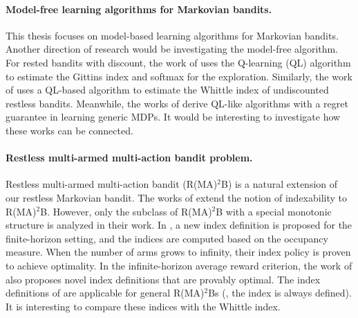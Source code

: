 \paragraph{Model-free learning algorithms for Markovian bandits.}
This thesis focuses on model-based learning algorithms for Markovian bandits. 
Another direction of research would be investigating the model-free algorithm.
For rested bandits with discount, the work of \cite{duff1995q} uses the Q-learning (QL) algorithm to estimate the Gittins index and softmax for the exploration.
Similarly, the work of \cite{avrachenkov2022whittle} uses a QL-based algorithm to estimate the Whittle index of undiscounted restless bandits.
Meanwhile, the works of \cite{jin2018q, wei2020model} derive QL-like algorithms with a regret guarantee in learning generic MDPs.
It would be interesting to investigate how these works can be connected.

\paragraph{Restless multi-armed multi-action bandit problem.}
Restless multi-armed multi-action bandit (R(MA)$^2$B) is a natural extension of our restless Markovian bandit.
The works of \cite{glazebrook2011general,hodge2015asymptotic} extend the notion of indexability to R(MA)$^2$B.
However, only the subclass of R(MA)$^2$B with a special monotonic structure is analyzed in their work.
In \cite{xiong2021reinforcement}, a new index definition is proposed for the finite-horizon setting, and the indices are computed based on the occupancy measure.
When the number of arms grows to infinity, their index policy is proven to achieve optimality.
In the infinite-horizon average reward criterion, the work of \cite{xiong2022learning} also proposes novel index definitions that are provably optimal.
The index definitions of \cite{xiong2021reinforcement, xiong2022learning} are applicable for general R(MA)$^2$Bs (\ie, the index is always defined).
It is interesting to compare these indices with the Whittle index.


